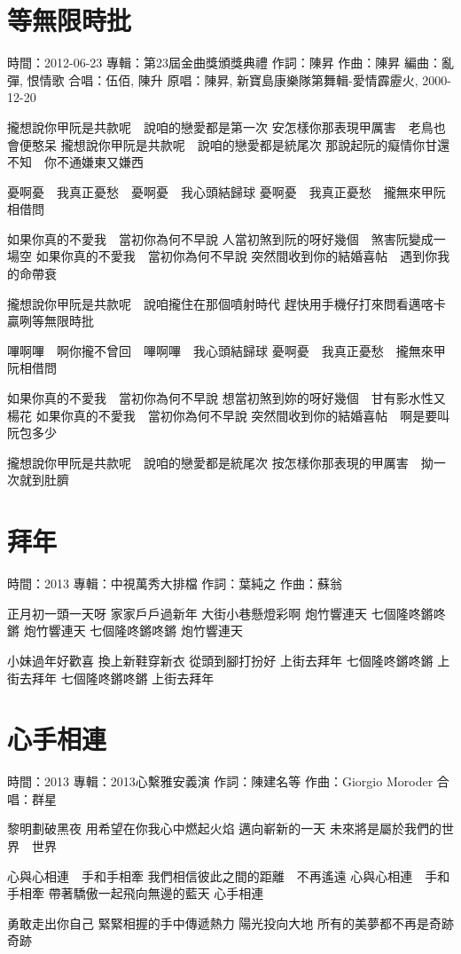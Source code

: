 \documentclass[UTF8,a4paper,oneside,twocolumn,12pt]{ctexbook}
\newcommand{\infopair}[2]{\textbullet #1：#2}
\newcommand{\zc}[1][伍佰]{\infopair{作詞}{#1}}
\newcommand{\zq}[1][伍佰]{\infopair{作曲}{#1}}
\newcommand{\bq}[1][伍佰]{\infopair{編曲}{#1}}
\newcommand{\zj}[1]{\infopair{專輯}{#1}}
\newcommand{\yc}[1]{\infopair{原唱}{#1}}
\newcommand{\sj}[1]{\infopair{時間}{#1}}
\newenvironment{info}{\begin{flushleft}\kaishu
	}
	{\end{flushleft}\normalsize\yahei\par}
\newenvironment{lyric}{
	}
{}
\begin{document}
\section{等無限時批}
\begin{info}
	\sj{2012-06-23}
	\zj{第23屆金曲獎頒獎典禮}
	\zc[陳昇]
	\zq[陳昇]
	\bq[亂彈, 恨情歌]
	\infopair{合唱}{伍佰, 陳升}
	\yc{陳昇, 新寶島康樂隊第舞輯-愛情霹靂火, 2000-12-20}
\end{info}
\begin{lyric}
	攏想說你甲阮是共款呢　說咱的戀愛都是第一次
	安怎樣你那表現甲厲害　老鳥也會便憨呆
	攏想說你甲阮是共款呢　說咱的戀愛都是統尾次
	那說起阮的癡情你甘還不知　你不通嫌東又嫌西

	憂啊憂　我真正憂愁　憂啊憂　我心頭結歸球
	憂啊憂　我真正憂愁　攏無來甲阮相借問

	如果你真的不愛我　當初你為何不早說
	人當初煞到阮的呀好幾個　煞害阮變成一場空
	如果你真的不愛我　當初你為何不早說
	突然間收到你的結婚喜帖　遇到你我的命帶衰

	攏想說你甲阮是共款呢　說咱攏住在那個噴射時代
	趕快用手機仔打來問看邁喀卡贏咧等無限時批

	嗶啊嗶　啊你攏不曾回　嗶啊嗶　我心頭結歸球
	憂啊憂　我真正憂愁　攏無來甲阮相借問

	如果你真的不愛我　當初你為何不早說
	想當初煞到妳的呀好幾個　甘有影水性又楊花
	如果你真的不愛我　當初你為何不早說
	突然間收到你的結婚喜帖　啊是要叫阮包多少

	攏想說你甲阮是共款呢　說咱的戀愛都是統尾次
	按怎樣你那表現的甲厲害　拗一次就到肚臍
\end{lyric}

\section{拜年} %
\begin{info}
	\sj{2013}
	\zj{中視萬秀大排檔}
	\zc[葉純之]
	\zq[蘇翁]
\end{info}
\begin{lyric}
	正月初一頭一天呀 家家戶戶過新年
	大街小巷懸燈彩啊 炮竹響連天
	七個隆咚鏘咚鏘 炮竹響連天
	七個隆咚鏘咚鏘 炮竹響連天

	小妹過年好歡喜 換上新鞋穿新衣
	從頭到腳打扮好 上街去拜年
	七個隆咚鏘咚鏘 上街去拜年
	七個隆咚鏘咚鏘 上街去拜年
\end{lyric}

\section{心手相連}
\begin{info}
	\sj{2013}
	\zj{2013心繫雅安義演}
	\zc[陳建名等]
	\zq[Giorgio Moroder]
	\infopair{合唱}{群星}
\end{info}
\begin{lyric}
	黎明劃破黑夜
	用希望在你我心中燃起火焰
	邁向嶄新的一天
	未來將是屬於我們的世界　世界

	心與心相連　手和手相牽
	我們相信彼此之間的距離　不再遙遠
	心與心相連　手和手相牽
	帶著驕傲一起飛向無邊的藍天
	心手相連

	勇敢走出你自己
	緊緊相握的手中傳遞熱力
	陽光投向大地
	所有的美夢都不再是奇跡　奇跡
\end{lyric}
\end{document}
